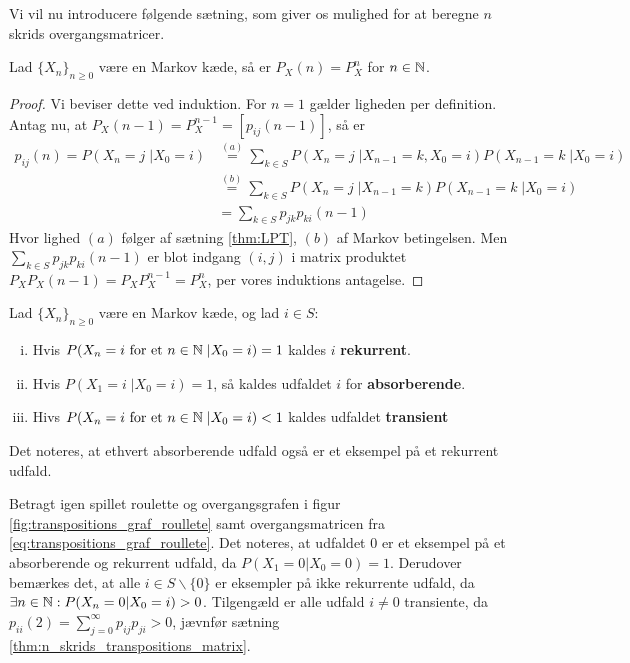 Vi vil nu introducere følgende sætning, som giver os mulighed for at beregne $n$ skrids overgangsmatricer.
\begin{thm} \label{thm:n_skrids_transpositions_matrix}
Lad $\{X_n\}_{n \geq 0}$ være en Markov kæde, så er $P_X(n) = P_X^n$ for $n \in \mathbb{N}$.
\end{thm}
\begin{proof}
Vi beviser dette ved induktion. For $n = 1$ gælder ligheden per definition. Antag nu, at $P_X(n - 1) = P_X^{n - 1} = [p_{ij}(n - 1)]$, så er 
\begin{align*} 
    p_{ij}(n) = P(X_n = j \;| X_0 = i) &\stackrel{(a)}= \sum_{k \in S} P(X_n = j\; | X_{n - 1} = k, X_0 = i) P(X_{n - 1} = k\; | X_0 = i) \\
    &\stackrel{(b)}= \sum_{k \in S} P(X_n = j\; | X_{n - 1} = k) P(X_{n - 1} = k\; | X_0 = i) \\
    &= \sum_{k \in S} p_{jk}p_{ki}(n - 1) 
\end{align*}
Hvor lighed $(a)$ følger af sætning \ref{thm:LPT}, $(b)$ af Markov betingelsen. Men $\displaystyle \sum_{k \in S} p_{jk}p_{ki}(n - 1)$ er blot indgang $(i, j)$ i matrix produktet $P_X P_X(n - 1) = P_X P_X^{n - 1} = P_X^n$, per vores induktions antagelse.
\end{proof}

\begin{defn}
  Lad $\{X_{n}\}_{n \geq 0}$ være en Markov kæde, og lad $i \in S$:
  \begin{enumerate}[i)]
    \item Hvis $P(X_{n} = i \text{ for et } n \in \mathbb{N} \;| X_{0} = i) = 1$ kaldes $i$ \textbf{rekurrent}.
    \item Hvis $P(X_{1} = i \;| X_{0} = i) = 1$, så kaldes udfaldet $i$ for \textbf{absorberende}.
    \item Hivs $P(X_n = i \text{ for et } n \in \mathbb{N} \;| X_0 = i) < 1$ kaldes udfaldet \textbf{transient}
  \end{enumerate}
\end{defn}

\begin{remark}
  Det noteres, at ethvert absorberende udfald også er et eksempel på et rekurrent udfald.
\end{remark}

\begin{example}
  Betragt igen spillet roulette og overgangsgrafen i figur \ref{fig:transpositions_graf_roullete} samt overgangsmatricen fra \ref{eq:transpositions_graf_roullete}. Det noteres, at udfaldet $0$ er et eksempel på et absorberende og rekurrent udfald, da $P(X_{1} = 0 | X_{0} = 0) = 1$. Derudover bemærkes det, at alle $i \in S \backslash \{0\}$ er eksempler på ikke rekurrente udfald, da $\exists n \in \mathbb{N}: P(X_{n} = 0 | X_{0} = i) > 0$. Tilgengæld er alle udfald $i \neq 0$ transiente, da $p_{ii}(2) = \sum_{j=0}^{\infty} p_{ij}p_{ji} > 0$, jævnfør sætning \ref{thm:n_skrids_transpositions_matrix}.
\end{example}

